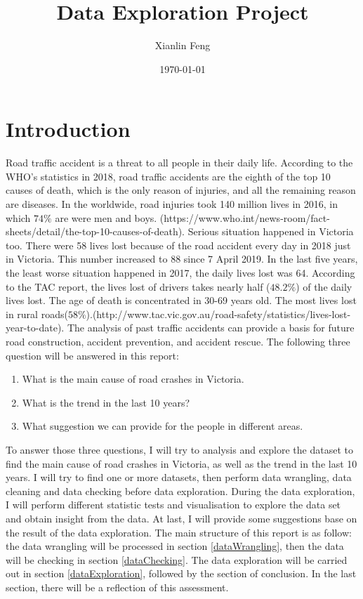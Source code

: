 \documentclass[11pt]{article}
\title{Data	Exploration Project}
\author{Xianlin Feng}
\date{\today}
\theoremstyle{definition}
\begin{document}
\maketitle

\section{Introduction}
Road traffic accident is a threat to all people in their daily life. According to the WHO's statistics in 2018, road traffic accidents are the eighth of the top 10 causes of death, which is the only reason of injuries, and all the remaining reason are diseases. In the worldwide, road injuries took 140 million lives in 2016, in which $74\%$ are were men and boys. (https://www.who.int/news-room/fact-sheets/detail/the-top-10-causes-of-death). Serious situation happened in Victoria too. There were 58 lives lost because of the road accident every day in 2018 just in Victoria. This number increased to 88 since 7 April 2019. In the last five years, the least worse situation happened in 2017, the daily lives lost was 64.  According to the TAC report, the lives lost of drivers takes nearly half ($48.2\%$) of the daily lives lost. The age of death is concentrated in 30-69 years old. The most lives lost in rural roads($58\%$).(http://www.tac.vic.gov.au/road-safety/statistics/lives-lost-year-to-date). The analysis of past traffic accidents can provide a basis for future road construction, accident prevention, and accident rescue. The following three question will be answered in this report:
\begin{enumerate}
	\item What is the main cause of road crashes in Victoria.
	\item What is the trend in the last 10 years?
	\item What suggestion we can provide for the people in different areas.
\end{enumerate}
To answer those three questions, I will try to analysis and explore the dataset to find the main cause of road crashes in Victoria, as well as the trend in the last 10 years. I will try to find one or more datasets, then perform data wrangling, data cleaning and data checking before data exploration. During the data exploration, I will perform different statistic tests and visualisation to explore the data set and obtain insight from the data. At last, I will provide some suggestions base on the result of the data exploration. The main structure of this report is as follow: the data wrangling will be processed in section \ref{dataWrangling}, then the data will be checking in section \ref{dataChecking}. The data exploration will be carried out in section \ref{dataExploration}, followed by the section of conclusion. In the last section, there will be a reflection of this assessment. 
\par
\end{document}
